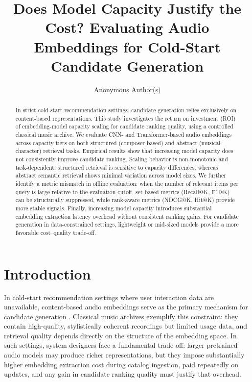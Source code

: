 \documentclass[sigconf]{acmart}
\begin{document}
\title{Does Model Capacity Justify the Cost? Evaluating Audio Embeddings for Cold-Start Candidate Generation}

\author{Anonymous Author(s)}

\renewcommand{\shortauthors}{Anonymous Author(s)}

\begin{abstract}
In strict cold-start recommendation settings, candidate generation relies exclusively on content-based representations. This study investigates the return on investment (ROI) of embedding-model capacity scaling for candidate ranking quality, using a controlled classical music archive. We evaluate CNN- and Transformer-based audio embeddings across capacity tiers on both structured (composer-based) and abstract (musical-character) retrieval tasks. Empirical results show that increasing model capacity does not consistently improve candidate ranking. Scaling behavior is non-monotonic and task-dependent: structured retrieval is sensitive to capacity differences, whereas abstract semantic retrieval shows minimal variation across model sizes. We further identify a metric mismatch in offline evaluation: when the number of relevant items per query is large relative to the evaluation cutoff, set-based metrics (Recall@K, F1@K) can be structurally suppressed, while rank-aware metrics (NDCG@K, Hit@K) provide more stable signals. Finally, increasing model capacity introduces substantial embedding extraction latency overhead without consistent ranking gains. For candidate generation in data-constrained settings, lightweight or mid-sized models provide a more favorable cost--quality trade-off.
\end{abstract}


\maketitle

\section{Introduction}\label{sec:introduction}
In cold-start recommendation settings where user interaction data are unavailable, content-based audio embeddings serve as the primary mechanism for candidate generation \cite{}. Classical music archives exemplify this constraint: they contain high-quality, stylistically coherent recordings but limited usage data, and retrieval quality depends directly on the structure of the embedding space. In such settings, system designers face a fundamental trade-off: larger pretrained audio models may produce richer representations, but they impose substantially higher embedding extraction cost during catalog ingestion, paid repeatedly on updates, and any gain in candidate ranking quality must justify that overhead.
\end{document}
